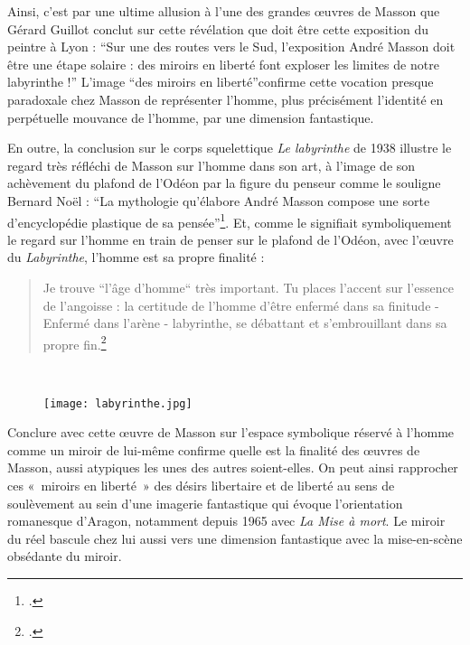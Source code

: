 	 Ainsi, c’est par une ultime allusion à l’une des grandes \oe{}uvres de Masson que Gérard Guillot conclut sur cette révélation que doit être cette exposition du peintre à Lyon : \enquote{Sur une des routes vers le Sud, l’exposition André Masson doit être une étape solaire : des miroirs en liberté font exploser les limites de notre labyrinthe !} L’image \enquote{des miroirs en liberté}confirme cette vocation presque paradoxale chez Masson de représenter l’homme, plus précisément l’identité en perpétuelle mouvance de l’homme, par une dimension fantastique.

	En outre, la conclusion sur le corps squelettique \emph{Le labyrinthe} de 1938 illustre le regard très réfléchi de Masson sur l’homme dans son art, à l’image de son achèvement du plafond de l’Odéon par la figure du penseur comme le souligne Bernard Noël : \enquote{La mythologie qu’élabore André Masson compose une sorte d’encyclopédie plastique de sa pensée}\footcite[p73]{noel}. Et, comme le signifiait symboliquement le regard sur l’homme en train de penser sur le plafond de l’Odéon, avec l’\oe{}uvre du \emph{Labyrinthe}, l’homme est sa propre finalité : 

\begin{quote}
Je trouve “l’âge d’homme“ très important. Tu places l’accent sur l’essence de l’angoisse : la certitude de l’homme d’être enfermé dans sa finitude - Enfermé dans l’arène - labyrinthe, se débattant et s’embrouillant dans sa propre fin.\footcite[p429]{anneessurrealistes}	
\end{quote}
 

\begin{figure}[H]
   \centering
   \texttt{[image: labyrinthe.jpg]}
	\caption{\cite{labyrinthe}}\label{fig:Labyrinthe}
\end{figure}


	 Conclure avec cette \oe{}uvre de Masson sur l’espace symbolique réservé à l’homme comme un miroir de lui-même confirme quelle est la finalité des \oe{}uvres de Masson, aussi atypiques les unes des autres soient-elles. On peut ainsi rapprocher ces « miroirs en liberté » des désirs libertaire et de liberté au sens de soulèvement au sein d’une imagerie fantastique qui évoque l’orientation romanesque d’Aragon, notamment depuis 1965 avec \emph{La Mise à mort}. Le miroir du réel bascule chez lui aussi vers une dimension fantastique avec la mise-en-scène obsédante du miroir. 

